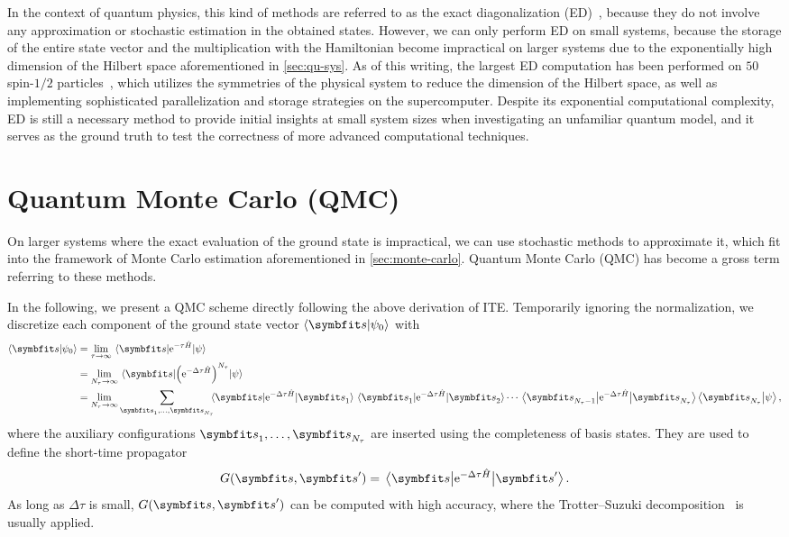 In the context of quantum physics, this kind of methods are referred to as the exact diagonalization (ED)~\cite{weisse2008exact}, because they do not involve any approximation or stochastic estimation in the obtained states. However, we can only perform ED on small systems, because the storage of the entire state vector and the multiplication with the Hamiltonian become impractical on larger systems due to the exponentially high dimension of the Hilbert space aforementioned in \cref{sec:qu-sys}. As of this writing, the largest ED computation has been performed on $50$ spin-$1/2$ particles~\cite{wietek2018sublattice}, which utilizes the symmetries of the physical system to reduce the dimension of the Hilbert space, as well as implementing sophisticated parallelization and storage strategies on the supercomputer. Despite its exponential computational complexity, ED is still a necessary method to provide initial insights at small system sizes when investigating an unfamiliar quantum model, and it serves as the ground truth to test the correctness of more advanced computational techniques.

\section{Quantum Monte Carlo (QMC)}
\label{sec:qmc}

On larger systems where the exact evaluation of the ground state is impractical, we can use stochastic methods to approximate it, which fit into the framework of Monte Carlo estimation aforementioned in \cref{sec:monte-carlo}. Quantum Monte Carlo (QMC) has become a gross term referring to these methods.

In the following, we present a QMC scheme directly following the above derivation of ITE. Temporarily ignoring the normalization, we discretize each component of the ground state vector $\ip{\vs}{\psi_0}$ with
\begin{align}
\ip{\vs}{\psi_0} &= \lim_{\tau \to \infty} \mel{\vs}{\rme^{-\tau \hat{H}}}{\psiinit} \\
&= \lim_{N_\tau \to \infty} \mel{\vs}{\edthp^{N_\tau}}{\psiinit} \\
&= \lim_{N_\tau \to \infty} \sum_{\vs_1, \ldots, \vs_{N_\tau}}\!\!\!\!\mel{\vs}{\edth}{\vs_1} \mel{\vs_1}{\edth}{\vs_2} \cdots \mel{\vs_{N_\tau - 1}}{\edth}{\vs_{N_\tau}} \ip{\vs_{N_\tau}}{\psiinit},
\end{align}
where the auxiliary configurations $\vs_1, \ldots, \vs_{N_\tau}$ are inserted using the completeness of basis states. They are used to define the short-time propagator
\begin{equation}
G(\vs, \vs') = \mel{\vs}{\edth}{\vs'}.
\end{equation}
As long as $\Delta \tau$ is small, $G(\vs, \vs')$ can be computed with high accuracy, where the Trotter--Suzuki decomposition~\cite{suzuki1976generalized} is usually applied.

